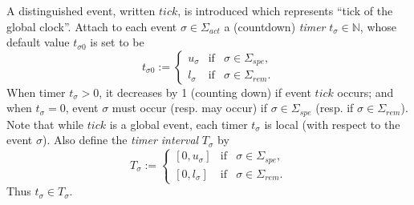 \documentclass[twocolumn]{autart}
\begin{document}
A distinguished event, written $tick$, is introduced which
represents ``tick of the global clock''. Attach to each event
$\sigma \in \Sigma_{act}$ a (countdown) {\it timer} $t_\sigma \in
\mathbb{N}$, whose default value $t_{\sigma0}$ is set to be
\begin{equation} \label{e2}
t_{\sigma 0} := \left\{
             \begin{array}{lcl}
             u_\sigma &\text{if} &\sigma \in \Sigma_{spe}, \\
             l_\sigma &\text{if} &\sigma \in \Sigma_{rem}.
             \end{array}
        \right.
\end{equation}
When timer $t_\sigma>0$, it decreases by 1 (counting down) if event $tick$
occurs; and when $t_\sigma = 0$, event $\sigma$ must occur (resp.
may occur) if $\sigma \in \Sigma_{spe}$ (resp. if $\sigma \in
\Sigma_{rem}$). Note that while $tick$ is a global event, each timer
$t_\sigma$ is local (with respect to the event $\sigma$). Also
define the {\it timer interval} $T_\sigma$ by
\begin{equation} \label{e3}
T_\sigma := \left\{
             \begin{array}{lcl}
             {[0, u_\sigma]} &\text{if} &\sigma \in \Sigma_{spe}, \\
             {[0, l_\sigma]} &\text{if} &\sigma \in \Sigma_{rem}.
             \end{array}
        \right.
\end {equation}
Thus $t_\sigma \in T_\sigma$.
\end{document}
